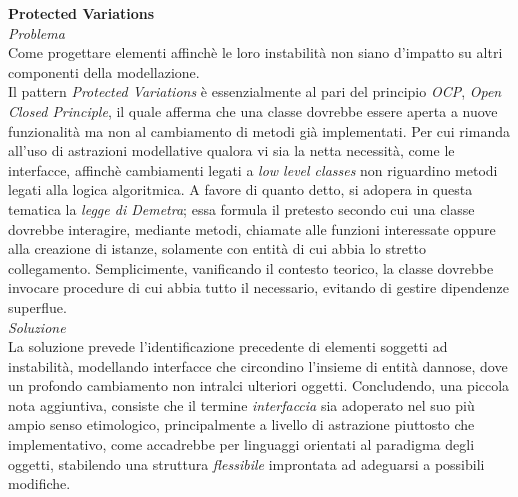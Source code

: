 \documentclass{article}
\begin{document}
\textbf{Protected Variations}\vspace*{7pt}\\
\textit{Problema}\\
Come progettare elementi affinchè le loro instabilità non siano d'impatto su altri componenti della modellazione.\vspace*{14pt}\\
Il pattern \textit{Protected Variations} è essenzialmente al pari del principio \textit{OCP}, \textit{Open Closed Principle}, il quale afferma che una classe dovrebbe essere aperta a nuove funzionalità ma non al cambiamento di metodi già implementati. Per cui rimanda all'uso di astrazioni modellative qualora vi sia la netta necessità, come le interfacce, affinchè cambiamenti legati a \textit{low level classes} non riguardino metodi legati alla logica algoritmica. A favore di quanto detto, si adopera in questa tematica la \textit{legge di Demetra}; essa formula il pretesto secondo cui una classe dovrebbe interagire, mediante metodi, chiamate alle funzioni interessate oppure alla creazione di istanze, solamente con entità di cui abbia lo stretto collegamento. Semplicimente, vanificando il contesto teorico, la classe dovrebbe invocare procedure di cui abbia tutto il necessario, evitando di gestire dipendenze superflue.\vspace*{14pt}\\
\textit{Soluzione}\\
La soluzione prevede l'identificazione precedente di elementi soggetti ad instabilità, modellando interfacce che circondino l'insieme di entità dannose, dove un profondo cambiamento non intralci ulteriori oggetti. Concludendo, una piccola nota aggiuntiva, consiste che il termine \textit{interfaccia} sia adoperato nel suo più ampio senso etimologico, principalmente a livello di astrazione piuttosto che implementativo, come accadrebbe per linguaggi orientati al paradigma degli oggetti, stabilendo una struttura \textit{flessibile} improntata ad adeguarsi a possibili modifiche.
\end{document}
